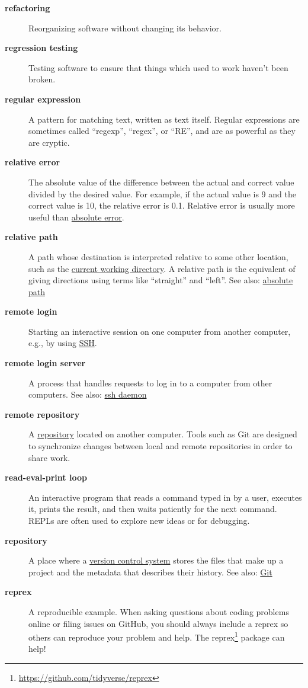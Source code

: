 \documentclass[
]{krantz}
\renewcommand{\href}[2]{#2\footnote{\url{#1}}}
\begin{document}
\begin{description}
\item[\textbf{refactoring}]
Reorganizing software without changing its behavior.
\item[\textbf{regression testing}]
Testing software to ensure that things which used to work haven't been broken.
\item[\textbf{regular expression}]
A pattern for matching text, written as text itself. Regular expressions are sometimes called ``regexp'', ``regex'', or ``RE'', and are as powerful as they are cryptic.
\item[\textbf{relative error}]
The absolute value of the difference between the actual and correct value divided by the desired value. For example, if the actual value is 9 and the correct value is 10, the relative error is 0.1. Relative error is usually more useful than \protect\hyperlink{absolute_error}{absolute error}.
\item[\textbf{relative path}]
A path whose destination is interpreted relative to some other location, such as the \protect\hyperlink{current_working_directory}{current working directory}. A relative path is the equivalent of giving directions using terms like ``straight'' and ``left''. See also: \protect\hyperlink{absolute_path}{absolute path}
\item[\textbf{remote login}]
Starting an interactive session on one computer from another computer, e.g., by using \protect\hyperlink{ssh}{SSH}.
\item[\textbf{remote login server}]
A process that handles requests to log in to a computer from other computers. See also: \protect\hyperlink{ssh_daemon}{ssh daemon}
\item[\textbf{remote repository}]
A \protect\hyperlink{repository}{repository} located on another computer. Tools such as Git are designed to synchronize changes between local and remote repositories in order to share work.
\item[\textbf{read-eval-print loop}]
An interactive program that reads a command typed in by a user, executes it, prints the result, and then waits patiently for the next command. REPLs are often used to explore new ideas or for debugging.
\item[\textbf{repository}]
A place where a \protect\hyperlink{version_control_system}{version control system} stores the files that make up a project and the metadata that describes their history. See also: \protect\hyperlink{git}{Git}
\item[\textbf{reprex}]
A reproducible example. When asking questions about coding problems online or filing issues on GitHub, you should always include a reprex so others can reproduce your problem and help. The \href{https://github.com/tidyverse/reprex}{reprex} package can help!

\end{description}
\end{document}
